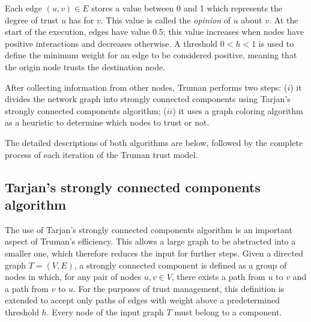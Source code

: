 \documentclass[conference]{IEEEtran}
\begin{document}
Each edge $(u, v) \in E$ stores a value between 0 and 1 which represents the degree of trust $u$ has for $v$.
This value is called the \textit{opinion} of $u$ about $v$.
At the start of the execution, edges have value $0.5$; this value increases when nodes have positive interactions and decreases otherwise.
A threshold $0 < h < 1$ is used to define the minimum weight for an edge to be considered positive, meaning that the origin node trusts the destination node.

After collecting information from other nodes, Truman performs two steps: ($i$) it divides the network graph into strongly connected components using Tarjan's strongly connected components algorithm; ($ii$) it uses a graph coloring algorithm as a heuristic to determine which nodes to trust or not.



The detailed descriptions of both algorithms are below, followed by the complete process of each iteration of the Truman trust model.



\subsection{Tarjan's strongly connected components algorithm}
\label{section:tarjan}
The use of Tarjan's strongly connected components algorithm \cite{tarjan1972depth} is an important aspect of Truman's efficiency.
This allows a large graph to be abstracted into a smaller one, which therefore reduces the input for further steps.
Given a directed graph $T = (V,E)$, a strongly connected component is defined as a group of nodes in which, for any pair of nodes $u, v \in V$, there exists a path from $u$ to $v$ and a path from $v$ to $u$.
For the purposes of trust management, this definition is extended to accept only paths of edges with weight above a predetermined threshold $h$.
Every node of the input graph $T$ must belong to a component.
\end{document}
